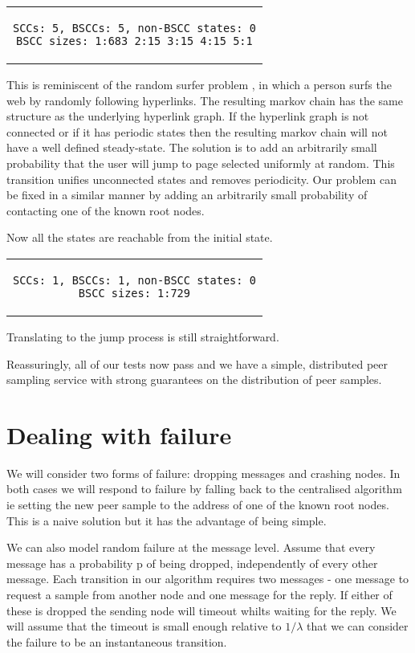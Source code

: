 \documentclass[a4paper,10pt]{article}
\newcommand{\prismmodel}[1]{
  \begin{quotation}
  \footnotesize
  
  \end{quotation}
}
\newenvironment{prismprop}[0]{
  \begin{center}
  \begin{tabular}{c}
  \footnotesize
}{
  \end{tabular}
  \end{center}
}
\begin{document}
\begin{prismprop}
\begin{lstlisting}
SCCs: 5, BSCCs: 5, non-BSCC states: 0
BSCC sizes: 1:683 2:15 3:15 4:15 5:1
\end{lstlisting}
\end{prismprop}

This is reminiscent of the random surfer problem \cite{random_surfer}, in which a person surfs the web by randomly following hyperlinks. The resulting markov chain has the same structure as the underlying hyperlink graph. If the hyperlink graph is not connected or if it has periodic states then the resulting markov chain will not have a well defined steady-state. The solution is to add an arbitrarily small probability that the user will jump to page selected uniformly at random. This transition unifies unconnected states and removes periodicity. Our problem can be fixed in a similar manner by adding an arbitrarily small probability of contacting one of the known root nodes.

\prismmodel{ctmc_full}

Now all the states are reachable from the initial state.

\begin{prismprop}
\begin{lstlisting}
SCCs: 1, BSCCs: 1, non-BSCC states: 0
BSCC sizes: 1:729
\end{lstlisting}
\end{prismprop}

Translating to the jump process is still straightforward.

\prismmodel{dtmc_full}

Reassuringly, all of our tests now pass and we have a simple, distributed peer sampling service with strong guarantees on the distribution of peer samples. 

\section{Dealing with failure}

We will consider two forms of failure: dropping messages and crashing nodes. In both cases we will respond to failure by falling back to the centralised algorithm ie setting the new peer sample to the address of one of the known root nodes. This is a naive solution but it has the advantage of being simple. 

We can also model random failure at the message level. Assume that every message has a probability p of being dropped, independently of every other message. Each transition in our algorithm requires two messages - one message to request a sample from another node and one message for the reply. If either of these is dropped the sending node will timeout whilts waiting for the reply. We will assume that the timeout is small enough relative to $1/\lambda$ that we can consider the failure to be an instantaneous transition.
\end{document}
